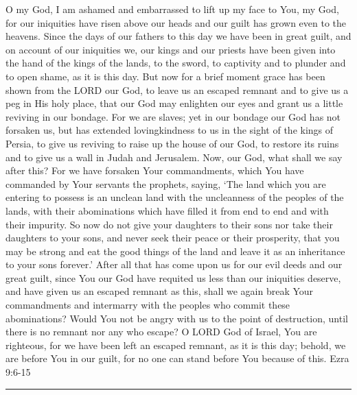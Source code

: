 \documentclass[]{book}
\begin{document}
O my God, I am ashamed and embarrassed to lift up my face to You, my God, for our iniquities have risen above our heads and our guilt has grown even to the heavens. Since the days of our fathers to this day we have been in great guilt, and on account of our iniquities we, our kings and our priests have been given into the hand of the kings of the lands, to the sword, to captivity and to plunder and to open shame, as it is this day. But now for a brief moment grace has been shown from the LORD our God, to leave us an escaped remnant and to give us a peg in His holy place, that our God may enlighten our eyes and grant us a little reviving in our bondage. For we are slaves; yet in our bondage our God has not forsaken us, but has extended lovingkindness to us in the sight of the kings of Persia, to give us reviving to raise up the house of our God, to restore its ruins and to give us a wall in Judah and Jerusalem. Now, our God, what shall we say after this? For we have forsaken Your commandments, which You have commanded by Your servants the prophets, saying, `The land which you are entering to possess is an unclean land with the uncleanness of the peoples of the lands, with their abominations which have filled it from end to end and with their impurity. So now do not give your daughters to their sons nor take their daughters to your sons, and never seek their peace or their prosperity, that you may be strong and eat the good things of the land and leave it as an inheritance to your sons forever.' After all that has come upon us for our evil deeds and our great guilt, since You our God have requited us less than our iniquities deserve, and have given us an escaped remnant as this, shall we again break Your commandments and intermarry with the peoples who commit these abominations? Would You not be angry with us to the point of destruction, until there is no remnant nor any who escape? O LORD God of Israel, You are righteous, for we have been left an escaped remnant, as it is this day; behold, we are before You in our guilt, for no one can stand before You because of this. \textbar{} Ezra 9:6-15

\begin{center}\rule{0.5\linewidth}{\linethickness}\end{center}
\end{document}
